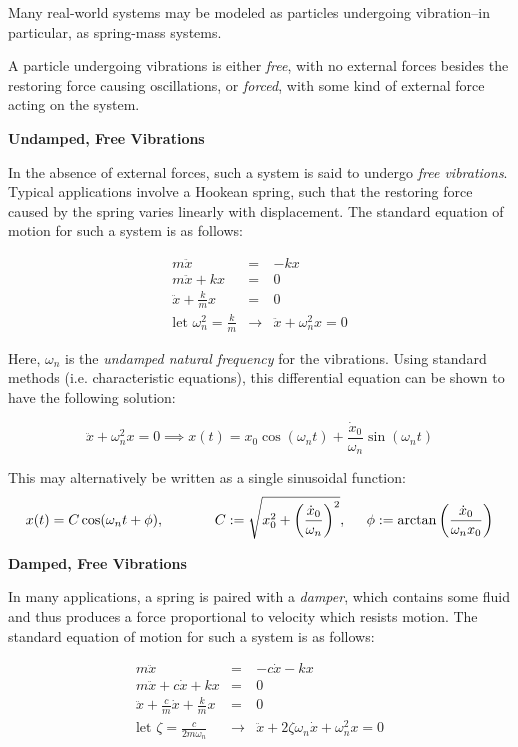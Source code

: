 Many real-world systems may be modeled as particles undergoing vibration--in particular, as spring-mass systems.

A particle undergoing vibrations is either \textit{free}, with no external forces besides the restoring force causing oscillations, or \textit{forced}, with some kind of external force acting on the system.

\textbf{Undamped, Free Vibrations}

In the absence of external forces, such a system is said to undergo \textit{free vibrations}. Typical applications involve a Hookean spring, such that the restoring force caused by the spring varies linearly with displacement. The standard equation of motion for such a system is as follows:

\begin{eqnarray*}
    m\ddot x &=& -kx\\
    m\ddot x + kx &=& 0\\
    \ddot x + \frac{k}{m}x &=& 0\\
    \text{let }\omega_n^2 = \frac{k}{m} &\longrightarrow& \boxed{\ddot x + \omega_n^2 x = 0}
\end{eqnarray*}

Here, $\omega_n$ is the \textit{undamped natural frequency} for the vibrations. Using standard methods (i.e. characteristic equations), this differential equation can be shown to have the following solution:

\[\ddot x + \omega_n^2x = 0 \implies \boxed{x(t) = x_0\cos(\omega_nt) + \frac{\dot x_0}{\omega_n}\sin(\omega_n t)}\]

This may alternatively be written as a single sinusoidal function: \[x(t) = C\cos(\omega_nt +\phi),\hspace{0.5in}C:=\sqrt{x_0^2+\left(\frac{\dot x_0}{\omega_n}\right)^2},\hspace{0.2in}\phi :=\arctan\left(\frac{\dot x_0}{\omega_nx_0}\right)\]

\textbf{Damped, Free Vibrations}

In many applications, a spring is paired with a \textit{damper}, which contains some fluid and thus produces a force proportional to velocity which resists motion. The standard equation of motion for such a system is as follows:

\begin{eqnarray*}
    m\ddot x &=& -c\dot x -kx\\
    m\ddot x + c\dot x+ kx &=& 0\\
    \ddot x + \frac{c}{m}\dot x + \frac{k}{m}x &=& 0\\
    \text{let }\zeta = \frac{c}{2m\omega_n} &\longrightarrow& \boxed{\ddot x + 2\zeta\omega_n \dot x + \omega_n^2x = 0}
\end{eqnarray*}

